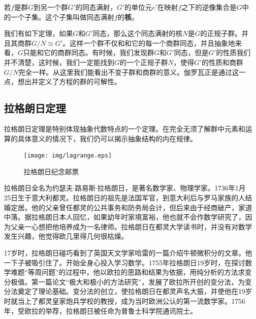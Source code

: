 \documentclass{article}
\begin{document}
\begin{definition}
若$f$是群$G$到另一个群$G'$的同态满射，$G'$的单位元$e'$在映射$f$之下的逆像集合是$G$中的一个子集。这个子集叫做同态满射$f$的\textbf{核}。
\end{definition}

我们有如下定理，如果$G$和$G'$同态，那么这个同态满射的核$N$是$G$的正规子群。并且其商群$G/N \cong G'$。这样一个群不仅和和它的每一个商群同态，并且抽象地来看，$G$只能和它的商群同态。有时候，我们发现群$G$和$G'$同态，但是$G'$的性质我们并不清楚，这时候，我们一定能找到$G$的一个正规子群$N$，使得$G'$的性质和商群$G/N$完全一样。从这里我们能看出不变子群和商群的意义。伽罗瓦正是通过这一点，想出并定义了方程的群的可解性。

\begin{Exercise}
\end{Exercise}

\subsection{拉格朗日定理}

拉格朗日定理是特别体现抽象代数特点的一个定理。在完全无须了解群中元素和运算的具体意义的情况下，我们仍可以揭示抽象结构的内在规律。

\begin{figure}
 \centering
 \texttt{[image: img/lagrange.eps]}
 \captionsetup{labelformat=empty}
 \caption{拉格朗日纪念邮票}
 \label{fig:Lagrange}
\end{figure}

拉格朗日全名为约瑟夫$\cdot$路易斯$\cdot$拉格朗日，是著名数学家、物理学家。1736年1月25日生于意大利都灵。拉格朗日的祖先是法国军官，到意大利后与罗马家族的人结婚定居。他的父亲曾任都灵的公共事务和防务局会计，但后来由于经商破产，家道中落。据拉格朗日本人回忆，如果幼年时家境富裕，他也就不会作数学研究了，因为父亲一心想把他培养成为一名律师。拉格朗日在都灵大学读书时，并没有对数学发生兴趣，他觉得欧几里得几何很枯燥。

17岁时，拉格朗日碰巧看到了英国天文学家哈雷的一篇介绍牛顿微积分的文章。他一下子被吸引住了。开始全身心投入学习数学。1755年拉格朗日19岁时，在探讨数学难题“等周问题”的过程中，他以欧拉的思路和结果为依据，用纯分析的方法求变分极值。第一篇论文“极大和极小的方法研究”，发展了欧拉所开创的变分法，为变分法奠定了理论基础。变分法的创立，使拉格朗日在都灵声名大振，并使他在19岁时就当上了都灵皇家炮兵学校的教授，成为当时欧洲公认的第一流数学家。1756年，受欧拉的举荐，拉格朗日被任命为普鲁士科学院通讯院士。
\end{document}
